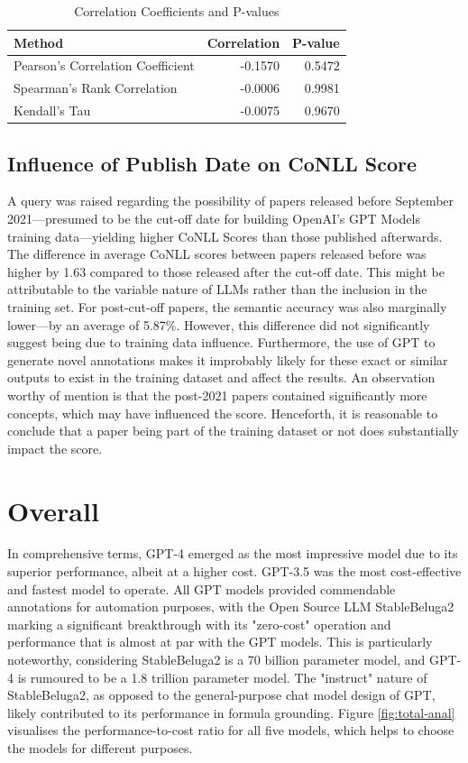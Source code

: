 \begin{table}[htpb]
    \centering
        \begin{tabular}{lrr}
        \hline
        Method & Correlation & P-value \\
        \hline
        Pearson's Correlation Coefficient & -0.1570 & 0.5472 \\
        Spearman's Rank Correlation & -0.0006 & 0.9981 \\
        Kendall's Tau & -0.0075 & 0.9670 \\
        \hline
    \end{tabular}
    \caption{Correlation Coefficients and P-values}\label{tab:spearman}
\end{table}

\subsection{Influence of Publish Date on CoNLL Score}

A query was raised regarding the possibility of papers released before September 2021—presumed to be the cut-off date for building OpenAI's GPT Models training data—yielding higher CoNLL Scores than those published afterwards. The difference in average CoNLL scores between papers released before was higher by 1.63 compared to those released after the cut-off date. This might be attributable to the variable nature of LLMs rather than the inclusion in the training set. For post-cut-off papers, the semantic accuracy was also marginally lower—by an average of 5.87\%. However, this difference did not significantly suggest being due to training data influence.
Furthermore, the use of GPT to generate novel annotations makes it improbably likely for these exact or similar outputs to exist in the training dataset and affect the results. An observation worthy of mention is that the post-2021 papers contained significantly more concepts, which may have influenced the score. Henceforth, it is reasonable to conclude that a paper being part of the training dataset or not does substantially impact the score.

\section{Overall}

In comprehensive terms, GPT-4 emerged as the most impressive model due to its superior performance, albeit at a higher cost. GPT-3.5 was the most cost-effective and fastest model to operate. All GPT models provided commendable annotations for automation purposes, with the Open Source LLM StableBeluga2 marking a significant breakthrough with its "zero-cost" operation and performance that is almost at par with the GPT models. This is particularly noteworthy, considering StableBeluga2 is a 70 billion parameter model, and GPT-4 is rumoured to be a 1.8 trillion parameter model. The "instruct" nature of StableBeluga2, as opposed to the general-purpose chat model design of GPT, likely contributed to its performance in formula grounding. Figure \ref{fig:total-anal} visualises the performance-to-cost ratio for all five models, which helps to choose the models for different purposes.

